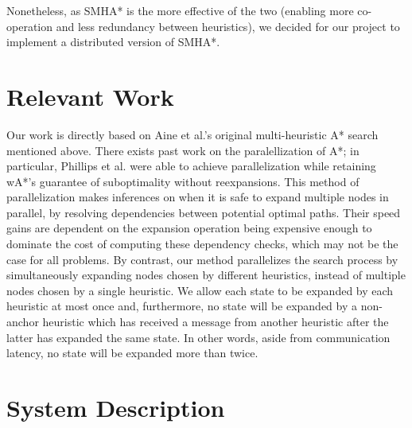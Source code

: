 \documentclass[11pt]{article}
\begin{document}
Nonetheless, as SMHA* is the more effective of the two (enabling more co-operation and less redundancy between heuristics), we decided for our project to implement a distributed version of SMHA*.

\section{Relevant Work}

Our work is directly based on Aine et al.'s original multi-heuristic A* search \cite{Aine14} mentioned above. There exists past work on the paralellization of A*; in particular, Phillips et al. \cite{phillips2014pa} were able to achieve parallelization while retaining wA*'s guarantee of suboptimality without reexpansions. This method of parallelization makes inferences on when it is safe to expand multiple nodes in parallel, by resolving dependencies between potential optimal paths. Their speed gains are dependent on the expansion operation being expensive enough to dominate the cost of computing these dependency checks, which may not be the case for all problems. By contrast, our method parallelizes the search process by simultaneously expanding nodes chosen by different heuristics, instead of multiple nodes chosen by a single heuristic. We allow each state to be expanded by each heuristic at most once and, furthermore, no state will be expanded by a non-anchor heuristic which has received a message from another heuristic after the latter has expanded the same state. In other words, aside from communication latency, no state will be expanded more than twice.

\section{System Description}
\end{document}
